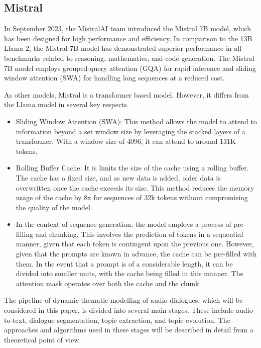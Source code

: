 \documentclass[PMI,VKR]{HSEUniversity}
\begin{document}
\subsection{Mistral}

In September 2023, the MistralAI \cite{mistral:2023} team introduced the Mistral 7B model, which has been designed for high performance and efficiency. 
In comparison to the 13B Llama 2, the Mistral 7B model has demonstrated superior performance in all benchmarks related to reasoning, mathematics, and code generation. 
The Mistral 7B model employs grouped-query attention (GQA) for rapid inference and sliding window attention (SWA) for handling long sequences at a reduced cost.

As other models, Mistral is a transformer based model. However, it differs from the Llama model in several key respects.
\begin{itemize}
    \item Sliding Window Attention (SWA): This method allows the model to attend to information beyond a set window size by leveraging the stacked layers of a transformer. 
    With a window size of 4096, it can attend to around 131K tokens. 
    \item Rolling Buffer Cache: It is limits the size of the cache using a rolling buffer. The cache has a fixed size, and as new data is added, older data is overwritten once the cache exceeds its size. 
    This method reduces the memory usage of the cache by 8x for sequences of 32k tokens without compromising the quality of the model.
    \item In the context of sequence generation, the model employs a process of pre-filling and chunking. 
    This involves the prediction of tokens in a sequential manner, given that each token is contingent upon the previous one. However, given that the prompts are known in advance, the cache can be pre-filled with them. 
    In the event that a prompt is of a considerable length, it can be divided into smaller units, with the cache being filled in this manner. 
    The attention mask operates over both the cache and the chunk
\end{itemize}


The pipeline of dynamic thematic modelling of audio dialogues, which will be considered in this paper, is divided into several main stages. 
These include audio-to-text, dialogue segmentation, topic extraction, and topic evolution. 
The approaches and algorithms used in these stages will be described in detail from a theoretical point of view.
\end{document}
